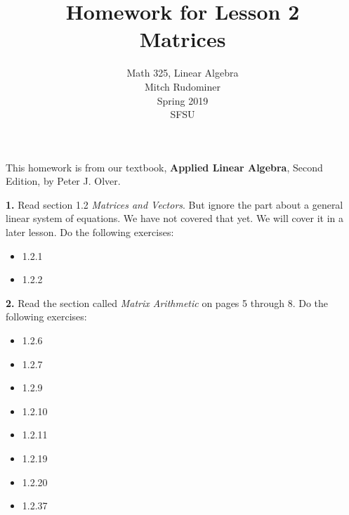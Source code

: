 \documentclass[oneside,12pt]{amsart}
\begin{document}
\title{Homework for Lesson 2 \\ Matrices}
\author{Math 325, Linear Algebra \\ Mitch Rudominer \\ Spring 2019 \\ SFSU }
\date{}

\maketitle

This homework is from our textbook,
\textbf{Applied Linear Algebra}, Second Edition, by Peter J. Olver.

\bigskip

\textbf{1.} Read section 1.2 \emph{Matrices and Vectors}. But ignore the part
about a general linear system of equations. We have not covered that yet.
We will cover it in a later lesson. Do the following exercises:
\begin{itemize}
\item 1.2.1
\item 1.2.2
\end{itemize}


\bigskip

\textbf{2.} Read the section called \emph{Matrix Arithmetic} on pages 5 through
8. Do the following exercises:
\begin{itemize}
\item 1.2.6
\item 1.2.7
\item 1.2.9
\item 1.2.10
\item 1.2.11
\item 1.2.19
\item 1.2.20
\item 1.2.37
\end{itemize}
\end{document}
